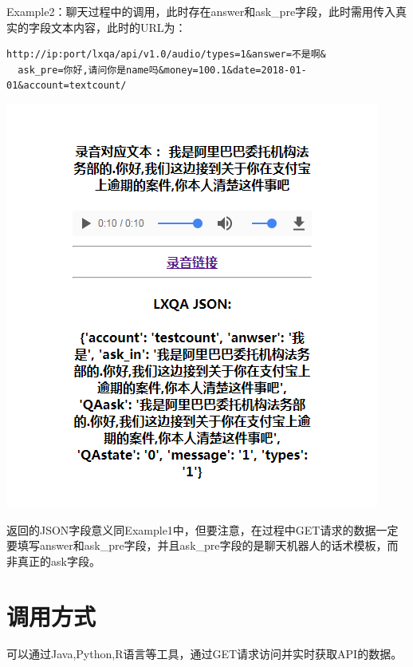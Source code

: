 \documentclass[]{book}
\begin{document}
Example2：聊天过程中的调用，此时存在answer和ask\_pre字段，此时需用传入真实的字段文本内容，此时的URL为：

\begin{verbatim}
http://ip:port/lxqa/api/v1.0/audio/types=1&answer=不是啊&
  ask_pre=你好,请问你是name吗&money=100.1&date=2018-01-01&account=textcount/
\end{verbatim}

\begin{center}\includegraphics[width=1.5\linewidth,height=1.5\textheight]{img/3-2} \end{center}

返回的JSON字段意义同Example1中，但要注意，在过程中GET请求的数据一定要填写answer和ask\_pre字段，并且ask\_pre字段的是聊天机器人的话术模板，而非真正的ask字段。

\section{\texorpdfstring{\textbf{调用方式}}{调用方式}}\label{-1}

可以通过Java,Python,R语言等工具，通过GET请求访问并实时获取API的数据。


\end{document}
